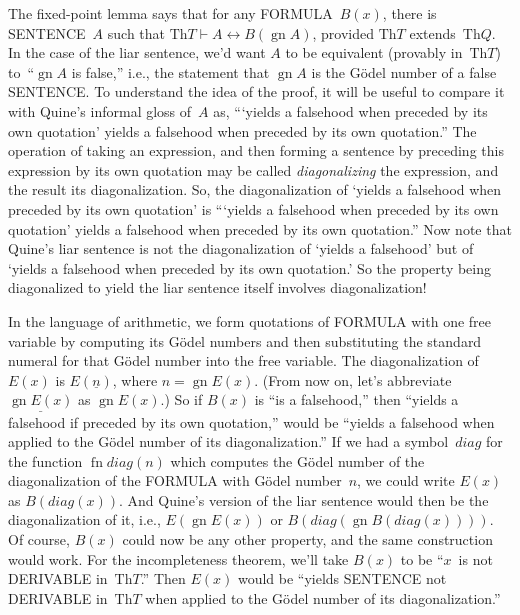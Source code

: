 \documentclass[10pt,a4paper]{article}
\newcommand*{\olup}[1]{\MakeUppercase{#1}}
\theoremstyle{plain}
\theoremstyle{definition}
\theoremstyle{remark}
\newenvironment{explain}{}{}
\providecommand{\Proves}{\mathrel{\vdash}}
\providecommand{\Obj}{}
\providecommand{\Th}{\ensuremath{\mathrm{Th}}}
\providecommand{\num}[1]{\underline{#1}}
\providecommand{\Gn}{\operatorname{gn}}
\providecommand{\gn}{\operatorname{gn}}
\providecommand{\liff}{\mathbin{\leftrightarrow}}
\providecommand{\fn}{\operatorname{fn}}
\begin{document}
\begin{explain}
The fixed-point lemma says that for any \olup{formula}~$B(x)$, there is
\olup{sentence}~$A$ such that $\Th{T} \Proves A \liff B(\gn{A})$,
provided $\Th{T}$ extends~$\Th{Q}$.  In the case of the liar sentence,
we'd want $A$ to be equivalent (provably in~$\Th{T}$) to~``$\gn{A}$
is false,'' i.e., the statement that $\Gn{A}$ is the G\"odel number
of a false \olup{sentence}. To understand the idea of the proof, it will
be useful to compare it with Quine's informal gloss of~$A$ as,
``{}`yields a falsehood when preceded by its own quotation' yields a
falsehood when preceded by its own quotation.''  The operation of
taking an expression, and then forming a sentence by preceding this
expression by its own quotation may be called \emph{diagonalizing} the
expression, and the result its diagonalization. So, the
diagonalization of `yields a falsehood when preceded by its own
quotation' is ``{}`yields a falsehood when preceded by its own
quotation' yields a falsehood when preceded by its own quotation.''
Now note that Quine's liar sentence is not the diagonalization of
`yields a falsehood' but of `yields a falsehood when preceded by its
own quotation.' So the property being diagonalized to yield the liar
sentence itself involves diagonalization!{}

In the language of arithmetic, we form quotations of \olup{formula} with
one free variable by computing its G\"odel numbers and then
substituting the standard numeral for that G\"odel number into the
free variable. The diagonalization of~$E(x)$ is $E(\num{n})$, where
$n = \Gn{E(x)}$. (From now on, let's abbreviate $\num{\Gn{E(x)}}$ as
$\gn{E(x)}$.)  So if $B(x)$ is ``is a falsehood,'' then ``yields a
falsehood if preceded by its own quotation,'' would be ``yields a
falsehood when applied to the G\"odel number of its diagonalization.''
If we had a symbol~$\Obj{diag}$ for the function $\fn{diag}(n)$ which
computes the G\"odel number of the diagonalization of the \olup{formula}
with G\"odel number~$n$, we could write $E(x)$ as
$B(\Obj{diag}(x))$. And Quine's version of the liar sentence would
then be the diagonalization of it, i.e., $E(\gn{E(x)})$ or
$B(\Obj{diag}(\gn{B(\Obj{diag}(x))}))$.  Of course, $B(x)$ could
now be any other property, and the same construction would work. For
the incompleteness theorem, we'll take $B(x)$ to be ``$x$~is not
\olup{derivable} in~$\Th{T}$.'' Then $E(x)$ would be ``yields
\olup{sentence} not \olup{derivable} in~$\Th{T}$ when applied to the
G\"odel number of its diagonalization.''


\end{explain}
\end{document}
